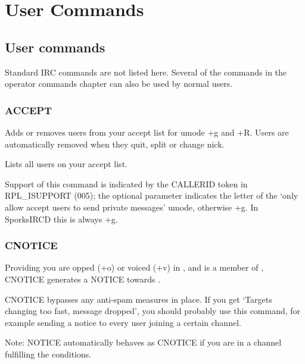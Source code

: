 \chapter{User Commands}
\label{ucommands}

\section{User commands}

	Standard IRC commands are not listed here. Several of the commands in
	the operator commands chapter can also be used by normal users.


\subsection{ACCEPT}

    \literal{,-{}}\literal{,}

	Adds or removes users from your accept list for umode +g and +R. Users
	are automatically removed when they quit, split or change nick.


    \literal{*}

	Lists all users on your accept list.

	Support of this command is indicated by the CALLERID token in
	RPL\_ISUPPORT (005); the optional parameter indicates the letter of the
	`only allow accept users to send private messages' umode, otherwise +g.
	In SporksIRCD this is always +g.


\subsection{CNOTICE}

      \literal{:}

	Providing you are opped (+o) or voiced (+v) in ,
	and  is a member of , CNOTICE
	generates a NOTICE towards .

	CNOTICE bypasses any anti-{}spam measures in place. If you get `Targets
	changing too fast, message dropped', you should probably use this
	command, for example sending a notice to every user joining a certain
	channel.

	Note: NOTICE automatically behaves as CNOTICE if you are in a channel
	fulfilling the conditions.

